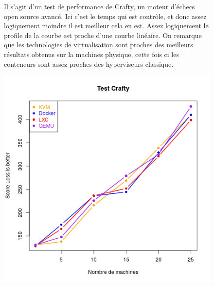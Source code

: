 \newpage
\begin{figure}[h]
   \begin{minipage}[c]{.46\linewidth}
	 Il s'agit d'un test de performance de Crafty, un moteur d'échecs open source avancé. Ici c'est le temps qui est contrôle, et donc assez logiquement moindre il est  meilleur cela en est. Assez logiquement le profile de la courbe est proche d'une courbe linéaire.
	  On remarque que les technologies de virtualisation sont proches des meilleurs résultats obtenus sur la machines physique, cette fois ci les conteneurs sont assez proches des hyperviseurs classique. 
   \end{minipage} \hfill
   \begin{minipage}[c]{.46\linewidth}
   	  
   	  \includegraphics[scale=0.55]{resultats/Crafty.png}
   \end{minipage}
\end{figure}

